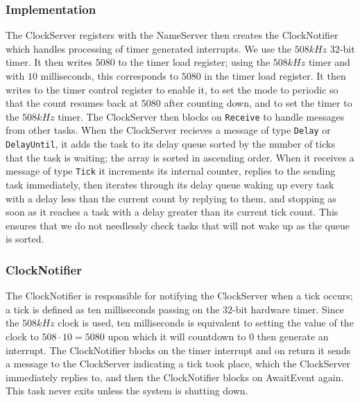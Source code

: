 \documentclass[12pt]{article}
\begin{document}
\subsubsection{Implementation}
The ClockServer registers with the NameServer then creates the ClockNotifier which handles processing of timer generated interrupts.  We use the $508kHz$ $32$-bit timer.  It then writes $5080$ to the timer load register; using the $508kHz$ timer and with $10$ milliseconds, this corresponds to $5080$ in the timer load register.  It then writes to the timer control register to enable it, to set the mode to periodic so that the count resumes back at $5080$ after counting down, and to set the timer to the $508kHz$ timer.  The ClockServer then blocks on \texttt{Receive} to handle messages from other tasks.  When the ClockServer recieves a message of type \texttt{Delay} or \texttt{DelayUntil}, it adds the task to its delay queue sorted by the number of ticks that the task is waiting; the array is sorted in ascending order.  When it receives a message of type \texttt{Tick} it increments its internal counter, replies to the sending task immediately, then iterates through its delay queue waking up every task with a delay less than the current count by replying to them, and stopping as soon as it reaches a task with a delay greater than its current tick count.  This ensures that we do not needlessly check tasks that will not wake up as the queue is sorted.
\\
\subsubsection{ClockNotifier}
The ClockNotifier is responsible for notifying the ClockServer when a tick occurs; a tick is defined as ten milliseconds passing on the $32$-bit hardware timer.  Since the $508kHz$ clock is used, ten milliseconds is equivalent to setting the value of the clock to $508\cdot 10 = 5080$ upon which it will countdown to $0$ then generate an interrupt.  The ClockNotifier blocks on the timer interrupt and on return it sends a message to the ClockServer indicating a tick took place, which the ClockServer immediately replies to, and then the ClockNotifier blocks on AwaitEvent again.  This task never exits unless the system is shutting down.
\\
\end{document}

